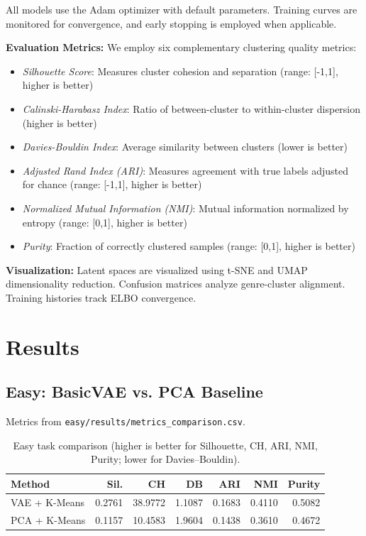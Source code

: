\documentclass[11pt]{article}
\begin{document}
All models use the Adam optimizer with default parameters. Training curves are monitored for convergence, and early stopping is employed when applicable.

\textbf{Evaluation Metrics:} We employ six complementary clustering quality metrics:
\begin{itemize}
\item \textit{Silhouette Score}: Measures cluster cohesion and separation (range: [-1,1], higher is better)
\item \textit{Calinski-Harabasz Index}: Ratio of between-cluster to within-cluster dispersion (higher is better)
\item \textit{Davies-Bouldin Index}: Average similarity between clusters (lower is better)
\item \textit{Adjusted Rand Index (ARI)}: Measures agreement with true labels adjusted for chance (range: [-1,1], higher is better)
\item \textit{Normalized Mutual Information (NMI)}: Mutual information normalized by entropy (range: [0,1], higher is better)
\item \textit{Purity}: Fraction of correctly clustered samples (range: [0,1], higher is better)
\end{itemize}

\textbf{Visualization:} Latent spaces are visualized using t-SNE and UMAP dimensionality reduction. Confusion matrices analyze genre-cluster alignment. Training histories track ELBO convergence.

\section{Results}
\subsection{Easy: BasicVAE vs. PCA Baseline}
Metrics from \texttt{easy/results/metrics_comparison.csv}.
\begin{table}[h]
\centering
\caption{Easy task comparison (higher is better for Silhouette, CH, ARI, NMI, Purity; lower for Davies--Bouldin).}
\begin{tabular}{lrrrrrr}
\toprule
Method & Sil. & CH & DB & ARI & NMI & Purity \\
\midrule
VAE + K-Means & 0.2761 & 38.9772 & 1.1087 & 0.1683 & 0.4110 & 0.5082 \\
PCA + K-Means & 0.1157 & 10.4583 & 1.9604 & 0.1438 & 0.3610 & 0.4672 \\
\bottomrule
\end{tabular}
\end{table}
\end{document}
